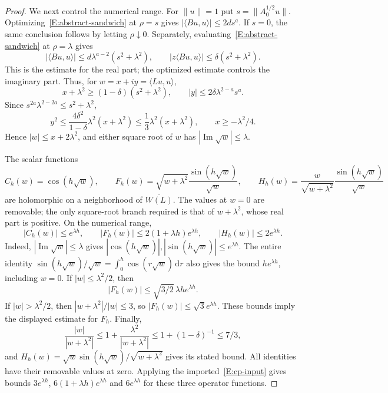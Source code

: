 \documentclass[12pt]{article}
\numberwithin{equation}{section}
\theoremstyle{definition}
\newcommand{\ud}{\,\mathrm{d}}
\begin{document}
\begin{proof}
  We next control the numerical range. For $\|u\|=1$ put
  $s=\|A_0^{1/2}u\|$. Optimizing~\eqref{E:abstract-sandwich} at
  $\rho=s$ gives $|\langle Bu,u\rangle|\le2ds^a$.
  If $s=0$, the same conclusion follows by letting $\rho\downarrow0$.
  Separately, evaluating~\eqref{E:abstract-sandwich} at $\rho=\lambda$
  gives
  \[
    |\langle Bu,u\rangle|
    \le d\lambda^{a-2}(s^2+\lambda^2),\qquad
    |z\langle Bu,u\rangle|\le\delta(s^2+\lambda^2).
  \]
  This is the estimate for the real part; the optimized estimate controls
  the imaginary part. Thus, for $w=x+iy=\langle Lu,u\rangle$,
  \[
    x+\lambda^2\ge(1-\delta)(s^2+\lambda^2),\qquad
    |y|\le2\delta\lambda^{2-a}s^a.
  \]
  Since $s^{2a}\lambda^{2-2a}\le s^2+\lambda^2$,
  \[
    y^2\le\frac{4\delta^2}{1-\delta}\lambda^2(x+\lambda^2)
    \le\frac13\lambda^2(x+\lambda^2),\qquad
    x\ge-\lambda^2/4.
  \]
  Hence $|w|\le x+2\lambda^2$, and either square root of $w$ has
  $|\operatorname{Im}\sqrt w|\le\lambda$.

  The scalar functions
  \[
    C_h(w)=\cos(h\sqrt w),\qquad
    F_h(w)=\sqrt{w+\lambda^2}\frac{\sin(h\sqrt w)}{\sqrt w},\qquad
    H_h(w)=\frac{w}{\sqrt{w+\lambda^2}}
    \frac{\sin(h\sqrt w)}{\sqrt w}
  \]
  are holomorphic on a neighborhood of $\overline{W(L)}$.
  The values at $w=0$ are removable; the only square-root branch
  required is that of $w+\lambda^2$, whose real part is positive.
  On the numerical range,
  \[
    |C_h(w)|\le e^{\lambda h},\qquad
    |F_h(w)|\le2(1+\lambda h)e^{\lambda h},\qquad
    |H_h(w)|\le2e^{\lambda h}.
  \]
  Indeed, $|\operatorname{Im}\sqrt w|\le\lambda$ gives
  $|\cos(h\sqrt w)|,|\sin(h\sqrt w)|\le e^{\lambda h}$.
  The entire identity
  $\sin(h\sqrt w)/\sqrt w=\int_0^h\cos(r\sqrt w)\ud r$
  also gives the bound $he^{\lambda h}$, including $w=0$.
  If $|w|\le\lambda^2/2$, then
  \[
    |F_h(w)|\le\sqrt{3/2}\,\lambda h e^{\lambda h}.
  \]
  If $|w|>\lambda^2/2$, then
  $|w+\lambda^2|/|w|\le3$, so
  $|F_h(w)|\le\sqrt3 e^{\lambda h}$.
  These bounds imply the displayed estimate for $F_h$.
  Finally,
  \[
    \frac{|w|}{|w+\lambda^2|}
    \le1+\frac{\lambda^2}{|w+\lambda^2|}
    \le1+(1-\delta)^{-1}\le7/3,
  \]
  and $H_h(w)=\sqrt w\sin(h\sqrt w)/\sqrt{w+\lambda^2}$ gives
  its stated bound. All identities have their removable values at zero.
  Applying the imported~\eqref{E:cp-input} gives bounds
  $3e^{\lambda h}$, $6(1+\lambda h)e^{\lambda h}$ and
  $6e^{\lambda h}$ for these three operator functions.


\end{proof}
\end{document}
